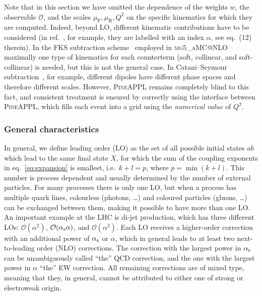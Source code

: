 Note that in this section we have omitted the dependence of the weights $w$, the observable $\mathcal{O}$, and the scales $\mu_\mathrm{F}, \mu_\mathrm{R}, Q^2$ on the specific kinematics for which they are computed.
Indeed, beyond LO, different kinematic contributions have to be considered (in ref.~\cite{Bertone:2014zva}, for example, they are labelled with an index $\alpha$, see eq.~(12) therein).
In the FKS subtraction scheme~\cite{Frixione:1995ms,Frixione:1997np} employed in \textsc{mg5\_aMC@NLO} maximally one type of kinematics for each counterterm (soft, collinear, and soft-collinear) is needed, but this is not the general case.
In Catani--Seymour subtraction~\cite{Catani:1996jh}, for example, different dipoles have different phase spaces and therefore different scales.
However, \textsc{PineAPPL} remains completely blind to this fact, and consistent treatment is ensured by correctly using the interface between \textsc{PineAPPL}, which fills each event into a grid using the \emph{numerical value} of $Q^2$.

\subsubsection{General characteristics}

In general, we define leading order (LO) as the set of all possible initial states $a b$ which lead to the same final state $X$, for which the sum of the coupling exponents in eq.~\eqref{eq:expansion} is smallest, i.e.\ $k + l = p$, where $p = \min (k+l)$.
This number is process dependent and usually determined by the number of external particles.
For many processes there is only one LO, but when a process has multiple quark lines, colourless (photons, \dots) and coloured particles (gluons, \ldots) can be exchanged between them, making it possible to have more than one LO.
An important example at the LHC is di-jet production, which has three different LOs: $\mathcal{O} (\alpha^2)$, $\mathcal{O} (\alpha_\mathrm{s} \alpha)$, and $\mathcal{O} (\alpha^2)$.
Each LO receives a higher-order correction with an additional power of $\alpha_\mathrm{s}$ or $\alpha$, which in general leads to at least two next-to-leading order (NLO) corrections.
The correction with the largest power in $\alpha_\mathrm{s}$ can be unambiguously called \enquote{the} QCD correction, and the one with the largest power in $\alpha$ \enquote{the} EW correction.
All remaining corrections are of mixed type, meaning that they, in general, cannot be attributed to either one of strong or electroweak origin.

